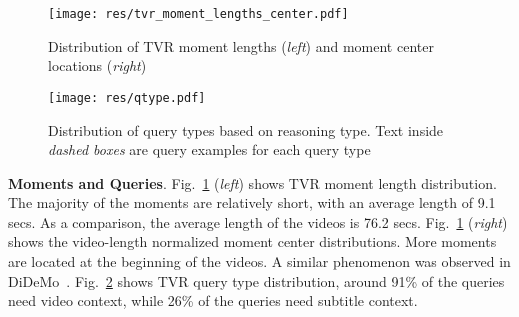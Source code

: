 \documentclass[runningheads]{llncs}
\newcommand{\ra}[1]{\renewcommand{\arraystretch}{#1}}
\begin{document}
\begin{table}[t]
\setlength{\tabcolsep}{0.3em}
\ra{1.}
\small
\centering
\caption{Data Statistics for each TV show. BBT=\textit{The Big Bang Theory}, HIMYM=\textit{How I Met You Mother}, Grey=\textit{Grey's Anatomy}, Epi=Episode, Sea.=Season}
\label{tab:dset_stat_by_genre}
\end{table}


\begin{figure}[!t]
  \centering
  \texttt{[image: res/tvr\_moment\_lengths\_center.pdf]}
  \caption{Distribution of TVR moment lengths (\textit{left}) and moment center locations (\textit{right})}
  \label{fig:tvr_moment_lengths_center}
\end{figure}


\begin{figure}[!t]
  \centering
  \texttt{[image: res/qtype.pdf]}
  \caption{Distribution of query types based on reasoning type. Text inside \textit{dashed boxes} are query examples for each query type} 
  \label{fig:qtype_dist}
\end{figure}

\kern2mm
\noindent\textbf{Moments and Queries}.
Fig.~\ref{fig:tvr_moment_lengths_center} (\textit{left}) shows TVR moment length distribution. The majority of the moments are relatively short, with an average length of 9.1 secs. As a comparison, the average length of the videos is 76.2 secs. Fig.~\ref{fig:tvr_moment_lengths_center} (\textit{right}) shows the video-length normalized moment center distributions. More moments are located at the beginning of the videos. A similar phenomenon was observed in DiDeMo~\cite{anne2017localizing}. Fig.~\ref{fig:qtype_dist} shows TVR query type distribution, around 91\% of the queries need video context, while 26\% of the queries need subtitle context.
\end{document}
